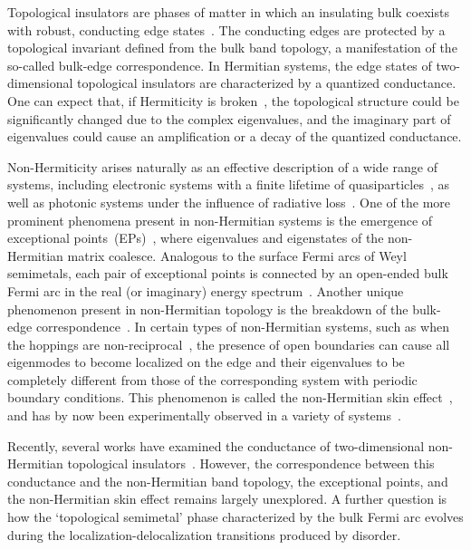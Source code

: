 \documentclass[aps,pra,reprint,superscriptaddress,showkeys,amsmath,amssymb,longbibliography]{revtex4-1}
\begin{document}
Topological insulators are phases of matter in which an insulating bulk coexists
with robust, conducting edge states~\cite{Hasan2010rmp, 2016RvMP...88c5005C}.
The conducting edges are protected by a topological invariant defined from the bulk band topology, a manifestation of the so-called bulk-edge correspondence.
In Hermitian systems, the edge states of two-dimensional topological insulators are characterized by a quantized conductance.
One can expect that, if Hermiticity is broken~\cite{Bergholtz2021rmp, Ashida2020, MartinezAlvarez2018}, the topological structure could be significantly changed due to the complex eigenvalues, and the imaginary part of eigenvalues could cause an amplification or a decay of the quantized conductance.

Non-Hermiticity arises naturally as an effective description of a wide range of systems, including electronic systems with a finite lifetime of quasiparticles~\cite{Kozii2017, Shen2018, Papaj2019, Nagai2020}, as well as photonic systems under the influence of radiative loss~\cite{Feng2017, ElGanainy2018, Ozawa2019,zdemir2019}.  
One of the more prominent phenomena present in non-Hermitian systems is the emergence of exceptional points~(EPs)~\cite{Bender1999, Heiss2012, Miri2019, Bergholtz2021rmp}, where eigenvalues and eigenstates of the non-Hermitian matrix coalesce. 
Analogous to the surface Fermi arcs of Weyl semimetals, each pair of exceptional points is connected by an open-ended bulk Fermi arc in the real (or imaginary) energy spectrum~\cite{Kozii2017, Malzard2018, Zhou2018, Carlstreom2018}. 
Another unique phenomenon present in non-Hermitian topology is the breakdown of the bulk-edge correspondence~\cite{Yao2018}. 
In certain types of non-Hermitian systems, such as when the hoppings are non-reciprocal~\cite{Hatano1996, Hatano1997}, the presence of open boundaries can cause all eigenmodes to become localized on the edge and their eigenvalues to be completely different from those of the corresponding system with periodic boundary conditions.
This phenomenon is called the non-Hermitian skin effect~\cite{Lee2016, Kunst2018, Xiong2018, Yao2018, Yao2018a, Yokomizo2019, Zhang2020, Longhi2020, Li2020, zhang2021}, and has by now been experimentally observed in a variety of systems~\cite{Xiao2020, Helbig2020, Ghatak2020, Weidemann2020}. 

Recently, several works have examined the conductance of two-dimensional non-Hermitian topological insulators~\cite{Chenyu2018, Philip2018, Wang2019, Hirsbrunner2019, Groenendijk2020}. 
However, the correspondence between this conductance and the non-Hermitian band topology, the exceptional points, and the non-Hermitian skin effect remains largely unexplored. 
A further question is how the `topological semimetal' phase characterized by the bulk Fermi arc evolves during the localization-delocalization transitions produced by disorder.
\end{document}
